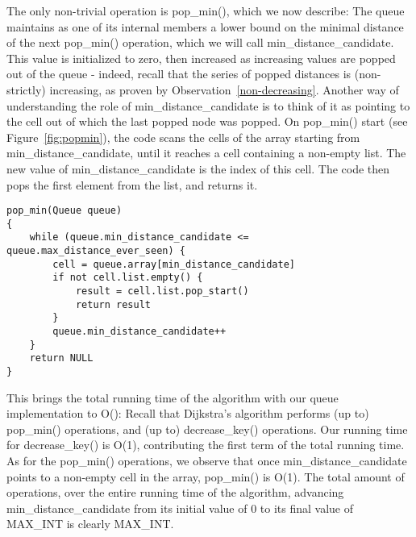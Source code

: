 \documentclass[conference,10pt,twocolumn]{IEEEtran}
\begin{document}
The only non-trivial operation is pop\_min(), which we now describe:
The queue maintains as one of its internal members a lower bound on the minimal distance of the next pop\_min() operation, which we will call min\_distance\_candidate. This value is initialized to zero, then increased as increasing values are popped out of the queue - indeed, recall that the series of popped distances is (non-strictly) increasing, as proven by Observation~\ref{non-decreasing}. Another way of understanding the role of min\_distance\_candidate is to think of it as pointing to the cell out of which the last popped node was popped.
On pop\_min() start (see Figure~\ref{fig:popmin}), the code scans the cells of the array starting from min\_distance\_candidate, until it reaches a cell containing a non-empty list. The new value of min\_distance\_candidate is the index of this cell. The code then pops the first element from the list, and returns it. 

\begin{figure*}[htb]
\begin{center}
\begin{verbatim}
pop_min(Queue queue)
{
    while (queue.min_distance_candidate <= queue.max_distance_ever_seen) {
        cell = queue.array[min_distance_candidate]
        if not cell.list.empty() {
            result = cell.list.pop_start()
            return result
        }
        queue.min_distance_candidate++
    }
    return NULL
}
\end{verbatim}
\end{center}
\caption{A pseudocode for the pop\_min() operation} \label{fig:popmin}
\end{figure*}

This brings the total running time of the algorithm with our queue implementation to O(): Recall that Dijkstra's algorithm performs (up to)  pop\_min() operations, and (up to)  decrease\_key() operations. Our running time for decrease\_key() is O(1), contributing the first term of the total running time. As for the pop\_min() operations, we observe that once min\_distance\_candidate points to a non-empty cell in the array, pop\_min() is O(1). The total amount of operations, over the entire running time of the algorithm, advancing min\_distance\_candidate from its initial value of 0 to its final value of MAX\_INT is clearly MAX\_INT.
\end{document}
